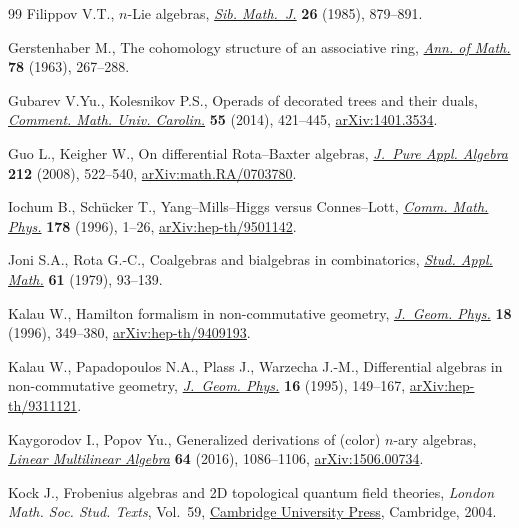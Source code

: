 \documentclass[10pt,a4paper]{amsart}
\numberwithin{equation}{section}
\begin{document}
\begin{thebibliography}{99}
Filippov V.T., {$n$}-{L}ie algebras, \href{https://doi.org/10.1007/BF00969110}{\textit{Sib. Math.~J.}} \textbf{26} (1985),
 879--891.

Gerstenhaber M., The cohomology structure of an associative ring, \href{https://doi.org/10.2307/1970343}{\textit{Ann.
 of Math.}} \textbf{78} (1963), 267--288.

Gubarev V.Yu., Kolesnikov P.S., Operads of decorated trees and their duals,
 \href{https://doi.org/10.1215/00294527-2798700}{\textit{Comment. Math. Univ. Carolin.}} \textbf{55} (2014), 421--445,
 \href{https://arxiv.org/abs/1401.3534}{arXiv:1401.3534}.

Guo L., Keigher W., On differential {R}ota--{B}axter algebras, \href{https://doi.org/10.1016/j.jpaa.2007.06.008}{\textit{J.~Pure
 Appl. Algebra}} \textbf{212} (2008), 522--540, \href{https://arxiv.org/abs/math.RA/0703780}{arXiv:math.RA/0703780}.

Iochum B., Sch\"ucker T., Yang--{M}ills--{H}iggs versus {C}onnes--{L}ott,
 \href{https://doi.org/10.1007/BF02104906}{\textit{Comm. Math. Phys.}} \textbf{178} (1996), 1--26,
 \href{https://arxiv.org/abs/hep-th/9501142}{arXiv:hep-th/9501142}.

Joni S.A., Rota G.-C., Coalgebras and bialgebras in combinatorics, \href{https://doi.org/10.1002/sapm197961293}{\textit{Stud.
 Appl. Math.}} \textbf{61} (1979), 93--139.

Kalau W., Hamilton formalism in non-commutative geometry, \href{https://doi.org/10.1016/0393-0440(95)00015-1}{\textit{J.~Geom.
 Phys.}} \textbf{18} (1996), 349--380, \href{https://arxiv.org/abs/hep-th/9409193}{arXiv:hep-th/9409193}.

Kalau W., Papadopoulos N.A., Plass J., Warzecha J.-M., Differential algebras in
 non-commutative geometry, \href{https://doi.org/10.1016/0393-0440(94)00025-Y}{\textit{J.~Geom. Phys.}} \textbf{16} (1995),
 149--167, \href{https://arxiv.org/abs/hep-th/9311121}{arXiv:hep-th/9311121}.

Kaygorodov I., Popov Yu., Generalized derivations of (color) {$n$}-ary algebras,
 \href{https://doi.org/10.1080/03081087.2015.1072492}{\textit{Linear Multilinear Algebra}} \textbf{64} (2016), 1086--1106,
 \href{https://arxiv.org/abs/1506.00734}{arXiv:1506.00734}.

Kock J., Frobenius algebras and 2{D} topological quantum field theories,
 \textit{London Math. Soc. Stud. Texts}, Vol.~59, \href{https://doi.org/10.1017/CBO9780511615443}{Cambridge University Press},
 Cambridge, 2004.


\end{thebibliography}
\end{document}
